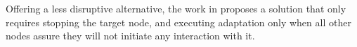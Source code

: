 \par Offering a less disruptive alternative, the work in \cite{Vandewoude2007} proposes a solution that only requires stopping the target node, and executing adaptation only when all other nodes assure they will not initiate any interaction with it. %
